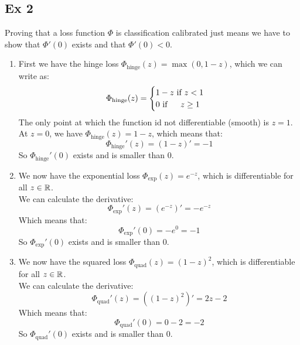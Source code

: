 \documentclass[12pt]{article}
\begin{document}
\newpage

\subsection*{Ex 2}

Proving that a loss function $\Phi$
is classification calibrated
just means we have to show that $\Phi'(0)$
exists and that $\Phi'(0) < 0$. \\

\begin{enumerate}[label = \letters]
    \item 
    First we have the hinge loss
    $\Phi_{\text{hinge}}(z) = \max(0, 1-z)$,
    which we can write as:
    \[ \Phi_{\text{hinge}}(z) = 
    \begin{cases} 1-z \text{ if } z < 1 \\
    0 \text{ if } \quad \; z \geq 1 \end{cases} \]
    The only point at which the function
    id not differentiable (smooth) is $z = 1$. \\
    At $z = 0$, we have 
    $\Phi_{\text{hinge}}(z) = 1-z$,
    which means that:
    \[ \Phi_{\text{hinge}}'(z) = (1-z)' = -1 \]
    So $\Phi_{\text{hinge}}'(0)$ 
    exists and is smaller than $0$.
    \item 
    We now have the exponential loss
    $\Phi_{\text{exp}}(z) = e^{-z}$,
    which is differentiable for all $z \in \mathbb{R}$. \\
    We can calculate the derivative:
    \[ \Phi_{\text{exp}}'(z) = (e^{-z})' = -e^{-z} \]
    Which means that:
    \[ \Phi_{\text{exp}}'(0) = -e^{0} = -1 \]
    So $\Phi_{\text{exp}}'(0)$
    exists and is smaller than $0$.
    \item 
    We now have the squared loss
    $\Phi_{\text{quad}}(z) = (1-z)^2$,
    which is differentiable for all $z \in \mathbb{R}$. \\
    We can calculate the derivative:
    \[ \Phi_{\text{quad}}'(z) = ((1-z)^2)' = 2z -2 \]
    Which means that:
    \[ \Phi_{\text{quad}}'(0) = 0 -2 = -2 \]
    So $\Phi_{\text{quad}}'(0)$
    exists and is smaller than $0$. \\
\end{enumerate}

\newpage
\end{document}
